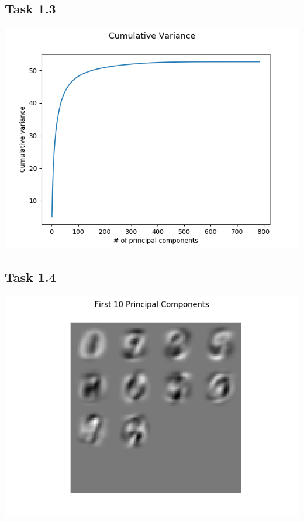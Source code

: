 \documentclass{article}
\begin{document}
\subsection*{Task 1.3}

\begin{center}
    \includegraphics[trim=0 0 0 0, scale=0.5]{images/task1_3_graph.png}
\end{center}

\subsection*{Task 1.4}

\begin{center}
    \includegraphics[trim=0 0 0 0, scale=0.55]{images/task1_4_imgs.png}
\end{center}
\end{document}
